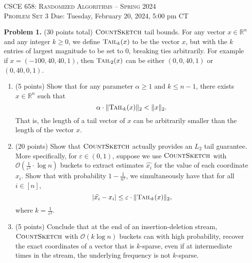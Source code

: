 \documentclass[11pt]{article}
\newcommand{\eps}{\varepsilon}
\newcommand{\tail}{\textsc{Tail}}
\newcommand{\CountSketch}{\textsc{CountSketch}}
\begin{document}
\begin{center}
{\Large\textsc{CSCE 658: Randomized Algorithms -- Spring 2024 \\ 
Problem Set 3}}
\vskip 0.1in
Due: Tuesday, February 20, 2024, 5:00 pm CT
\end{center}

\noindent
\textbf{Problem 1.} (30 points total)
$\CountSketch$ tail bounds. 
\vskip 0.1in\noindent
For any vector $x\in\mathbb{R}^n$ and any integer $k\ge 0$, we define $\tail_k(x)$ to be the vector $x$, but with the $k$ entries of largest magnitude to be set to $0$, breaking ties arbitrarily. 
For example if $x=(-100, 40, 40, 1)$, then $\tail_2(x)$ can be either $(0, 0, 40, 1)$ or $(0, 40, 0, 1)$.
\begin{enumerate}
\item (5 points)
Show that for any parameter $\alpha\ge 1$ and $k\le n-1$, there exists $x\in\mathbb{R}^n$ such that
\[\alpha\cdot\|\tail_k(x)\|_2<\|x\|_2.\]
That is, the length of a tail vector of $x$ can be arbitrarily smaller than the length of the vector $x$. 
\item (20 points)
Show that $\CountSketch$ actually provides an $L_2$ tail guarantee. 
More specifically, for $\eps\in(0,1)$, suppose we use $\CountSketch$ with $\mathcal{O}\left(\frac{1}{\eps^2}\cdot\log n\right)$ buckets to extract estimates $\widehat{x_i}$ for the value of each coordinate $x_i$. 
Show that with probability $1-\frac{1}{n^2}$, we simultaneously have that for all $i\in[n]$,
\[|\widehat{x_i}-x_i|\le\eps\cdot\|\tail_k(x)\|_2,\]
where $k=\frac{1}{\eps^2}$. 
\item (5 points)
Conclude that at the end of an insertion-deletion stream, $\CountSketch$ with $\mathcal{O}(k\log n)$ buckets can with high probability, recover the exact coordinates of a vector that is $k$-sparse, even if at intermediate times in the stream, the underlying frequency is not $k$-sparse.
\end{enumerate}
\end{document}
